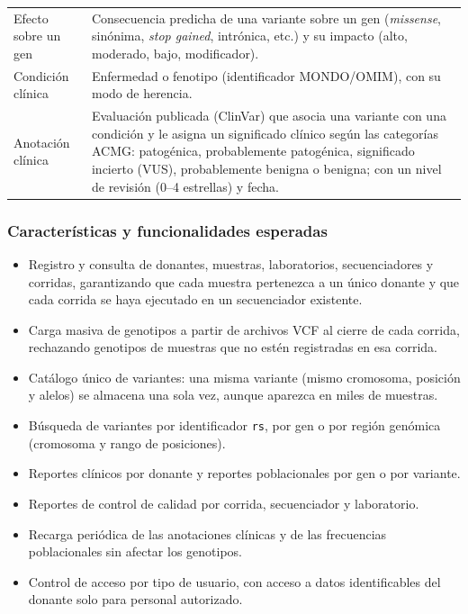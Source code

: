 \documentclass[11pt,a4paper]{article}
\newcommand{\tb}[1]{\texttt{#1}}
\begin{document}
\begin{longtable}{>{\raggedright\arraybackslash}p{3.2cm} >{\raggedright\arraybackslash}p{11.8cm}}
Efecto sobre un gen & Consecuencia predicha de una variante sobre un gen (\emph{missense}, sinónima, \emph{stop gained}, intrónica, etc.) y su impacto (alto, moderado, bajo, modificador). \\
Condición clínica & Enfermedad o fenotipo (identificador MONDO/OMIM), con su modo de herencia. \\
Anotación clínica & Evaluación publicada (ClinVar) que asocia una variante con una condición y le asigna un significado clínico según las categorías ACMG: patogénica, probablemente patogénica, significado incierto (VUS), probablemente benigna o benigna; con un nivel de revisión (0--4 estrellas) y fecha. \\
\bottomrule
\end{longtable}

\subsubsection{Características y funcionalidades esperadas}

\begin{itemize}
  \item Registro y consulta de donantes, muestras, laboratorios, secuenciadores y corridas, garantizando que cada muestra pertenezca a un único donante y que cada corrida se haya ejecutado en un secuenciador existente.
  \item Carga masiva de genotipos a partir de archivos VCF al cierre de cada corrida, rechazando genotipos de muestras que no estén registradas en esa corrida.
  \item Catálogo único de variantes: una misma variante (mismo cromosoma, posición y alelos) se almacena una sola vez, aunque aparezca en miles de muestras.
  \item Búsqueda de variantes por identificador \tb{rs}, por gen o por región genómica (cromosoma y rango de posiciones).
  \item Reportes clínicos por donante y reportes poblacionales por gen o por variante.
  \item Reportes de control de calidad por corrida, secuenciador y laboratorio.
  \item Recarga periódica de las anotaciones clínicas y de las frecuencias poblacionales sin afectar los genotipos.
  \item Control de acceso por tipo de usuario, con acceso a datos identificables del donante solo para personal autorizado.
\end{itemize}
\end{document}
